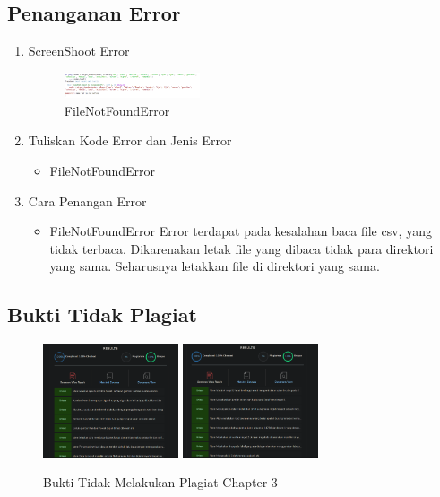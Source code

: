 \subsection{Penanganan Error}
\begin{enumerate}
	\item ScreenShoot Error
	\begin{figure}[H]
		\includegraphics[width=4cm]{figures/1174021/tugas2/error/1.PNG}
		\centering
		\caption{FileNotFoundError}
	\end{figure}
	\item Tuliskan Kode Error dan Jenis Error
	\begin{itemize}
		\item FileNotFoundError
	\end{itemize}
	\item Cara Penangan Error
	\begin{itemize}
		\item FileNotFoundError
		\hfill\break
		Error terdapat pada kesalahan baca file csv, yang tidak terbaca. Dikarenakan letak file yang dibaca tidak para direktori yang sama. Seharusnya letakkan file di direktori yang sama. 
	\end{itemize}
\end{enumerate}
\subsection{Bukti Tidak Plagiat}
\begin{figure}[H]
\centering
	\includegraphics[width=4cm]{figures/1174021/tugas3/buktiplagiat/1.PNG}
	\includegraphics[width=4cm]{figures/1174021/tugas3/buktiplagiat/2.PNG}
	\caption{Bukti Tidak Melakukan Plagiat Chapter 3}
\end{figure}

